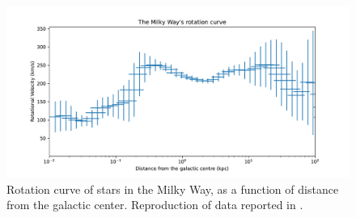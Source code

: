 \begin{figure}
    \centering
    \includegraphics[width=\textwidth]{figures/RotationCurveMilkyWay.pdf}
    \caption{Rotation curve of stars in the Milky Way, as a function of distance from the galactic center. Reproduction of data reported in \cite{Sofue2020}.}
    \label{fig:MilkyWayRotationCurve}
\end{figure}

